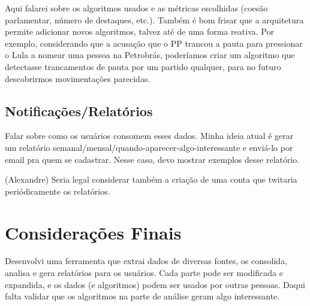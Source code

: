 \documentclass[a4paper,titlepage]{ppgi}\usepackage[]{graphicx}\usepackage[]{color}
\begin{document}
Aqui falarei sobre os algoritmos usados e as métricas escolhidas (coesão parlamentar, número de destaques, etc.). Também é bom frisar que a arquitetura permite adicionar novos algoritmos, talvez até de uma forma reativa. Por exemplo, considerando que a acusação que o PP trancou a pauta para pressionar o Lula a nomear uma pessoa na Petrobrás, poderíamos criar um algoritmo que detectasse trancamentos de pauta por um partido qualquer, para no futuro descobrirmos movimentações parecidas.

\subsection{Notificações/Relatórios}

Falar sobre como os usuários consomem esses dados. Minha ideia atual é gerar um relatório semanal/mensal/quando-aparecer-algo-interessante e enviá-lo por email pra quem se cadastrar. Nesse caso, devo mostrar exemplos desse relatório.


(Alexandre) Seria legal considerar também a criação de uma conta que twitaria periódicamente os relatórios.


\section{Considerações Finais}

Desenvolvi uma ferramenta que extrai dados de diversas fontes, os consolida, analisa e gera relatórios para os usuários. Cada parte pode ser modificada e expandida, e os dados (e algoritmos) podem ser usados por outras pessoas. Daqui falta validar que os algoritmos na parte de análise geram algo interessante.







\appendix

\end{document}
